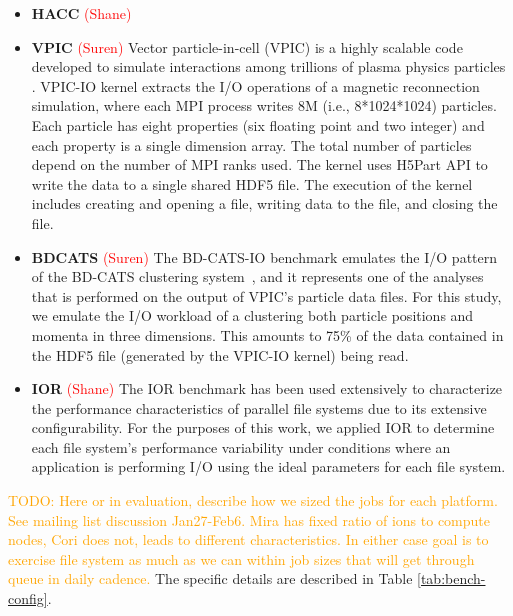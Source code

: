 \documentclass[conference,10pt,compsocconf]{IEEEtran}
\newcommand{\assign}[1]{\textcolor{red}{(#1)}}
\newcommand{\todo}[1]{\textcolor{Orange}{TODO: #1}}
\begin{document}
\begin{itemize}
\item \textbf{HACC} \assign{Shane}
\item \textbf{VPIC} \assign{Suren} 
Vector particle-in-cell (VPIC) is a highly scalable code developed to simulate
interactions among trillions of plasma physics particles  \cite{Bowers2008}.
VPIC-IO kernel extracts the I/O operations of a magnetic reconnection
simulation, where each MPI process writes 8M (i.e., 8*1024*1024) particles. Each
particle has eight properties (six floating point and two integer) and each
property is a single dimension array. The total number of particles depend on
the number of MPI ranks used. The kernel uses H5Part API \cite{H5Part} to write
the data to a single shared HDF5 file. The execution of the kernel includes
creating and opening a file, writing data to the file, and closing the file.

\item \textbf{BDCATS} \assign{Suren} The BD-CATS-IO benchmark emulates the I/O
pattern of the BD-CATS clustering system~\cite{Patwary2015}, and it represents
one of the analyses that is performed on the output of VPIC's particle data files.
For this study, we emulate the I/O workload of a clustering both particle
positions and momenta in three dimensions.  This amounts to 75\% of the data
contained in the HDF5 file (generated by the VPIC-IO kernel) being read.

\item \textbf{IOR} \assign{Shane} The IOR benchmark has been used extensively
to characterize the performance characteristics of parallel file systems\cite{Yildiz2016,Xie2012,Lofstead2010,Uselton2010}
due to its extensive configurability.  For the purposes of this work, we applied
IOR to determine each file system's performance variability under conditions
where an application is performing I/O using the ideal parameters for each
file system.

\end{itemize}

\todo{Here or in evaluation, describe how we sized the jobs for each
platform.  See mailing list discussion Jan27-Feb6.  Mira has fixed ratio of
ions to compute nodes, Cori does not, leads to different characteristics.  In
either case goal is to exercise file system as much as we can within job
sizes that will get through queue in daily cadence.}  The specific details are
described in Table \ref{tab:bench-config}.
\end{document}

